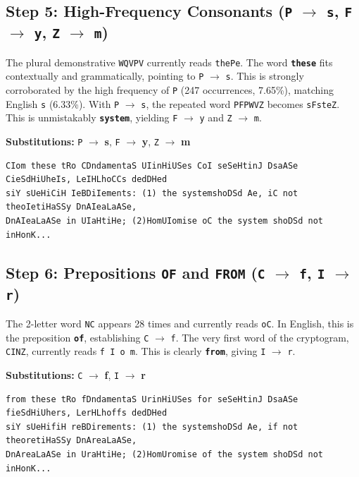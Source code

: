 \documentclass[12pt,a4paper]{article}
\begin{document}
\subsection{Step 5: High-Frequency Consonants (\texorpdfstring{\texttt{P} $\to$ \texttt{s}, \texttt{F} $\to$ \texttt{y}, \texttt{Z} $\to$ \texttt{m}}{P -> s, F -> y, Z -> m})}
The plural demonstrative \texttt{WQVPV} currently reads \texttt{thePe}. The word \textbf{\texttt{these}} fits contextually and grammatically, pointing to \texttt{P} $\to$ \texttt{s}. This is strongly corroborated by the high frequency of \texttt{P} (247 occurrences, 7.65\%), matching English \texttt{s} (6.33\%).
With \texttt{P} $\to$ \texttt{s}, the repeated word \texttt{PFPWVZ} becomes \texttt{sFsteZ}. This is unmistakably \textbf{\texttt{system}}, yielding \texttt{F} $\to$ \texttt{y} and \texttt{Z} $\to$ \texttt{m}.
\begin{center}
    \textbf{Substitutions:} \texttt{P} $\to$ \textbf{s}, \texttt{F} $\to$ \textbf{y}, \texttt{Z} $\to$ \textbf{m}
\end{center}

\begin{lstlisting}[caption={Text snippet after Step 5}]
CIom these tRo CDndamentaS UIinHiUSes CoI seSeHtinJ DsaASe CieSdHiUheIs, LeIHLhoCCs dedDHed 
siY sUeHiCiH IeBDiIements: (1) the systemshoDSd Ae, iC not theoIetiHaSSy DnAIeaLaASe, 
DnAIeaLaASe in UIaHtiHe; (2)HomUIomise oC the system shoDSd not inHonK...
\end{lstlisting}

\subsection{Step 6: Prepositions \texttt{OF} and \texttt{FROM} (\texorpdfstring{\texttt{C} $\to$ \texttt{f}, \texttt{I} $\to$ \texttt{r}}{C -> f, I -> r})}
The 2-letter word \texttt{NC} appears 28 times and currently reads \texttt{oC}. In English, this is the preposition \textbf{\texttt{of}}, establishing \texttt{C} $\to$ \texttt{f}.
The very first word of the cryptogram, \texttt{CINZ}, currently reads \texttt{f I o m}. This is clearly \textbf{\texttt{from}}, giving \texttt{I} $\to$ \texttt{r}.
\begin{center}
    \textbf{Substitutions:} \texttt{C} $\to$ \textbf{f}, \texttt{I} $\to$ \textbf{r}
\end{center}

\begin{lstlisting}[caption={Text snippet after Step 6}]
from these tRo fDndamentaS UrinHiUSes for seSeHtinJ DsaASe fieSdHiUhers, LerHLhoffs dedDHed 
siY sUeHifiH reBDirements: (1) the systemshoDSd Ae, if not theoretiHaSSy DnAreaLaASe, 
DnAreaLaASe in UraHtiHe; (2)HomUromise of the system shoDSd not inHonK...
\end{lstlisting}
\end{document}
